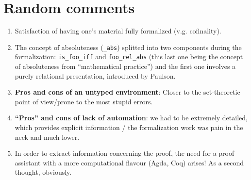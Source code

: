 \section{Random comments}

\begin{enumerate}
\item Satisfaction of having one's material fully formalized
  (v.g. cofinality).
\item The concept of absoluteness (\verb|_abs|) splitted into two components
  during the formalization: \verb|is_foo_iff| and \verb|foo_rel_abs| (this last one
  being the concept of absoluteness from  “mathematical practice”) and
  the first one involves a purely relational presentation, introduced
  by Paulson.
\item  \textbf{Pros and cons of an untyped environment}: Closer to the
  set-theoretic point of view/prone to the most stupid errors.
\item \textbf{“Pros” and cons of lack of automation}: we had to be extremely
  detailed, which provides explicit information / the formalization
  work was pain in the neck and much lower.
\item In order to extract information concerning the proof, the need for a
  proof assistant with a more computational flavour (Agda, Coq)
  arises! As a second thought, obviously.
\end{enumerate}

